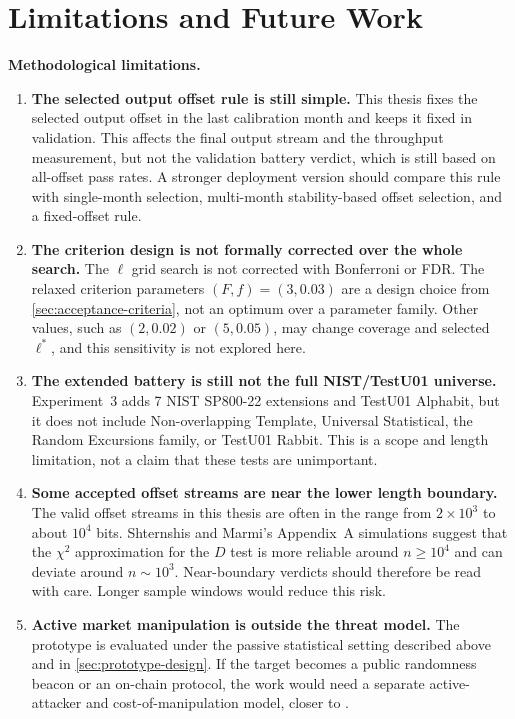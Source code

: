 \documentclass[11pt,titlepage,openany,oneside]{book}  %
\begin{document}
\section{Limitations and Future Work}
\label{sec:limitations-future-work}

\textbf{Methodological limitations.}

\begin{enumerate}
\item \textbf{The selected output offset rule is still simple.} This thesis fixes the selected output offset in the last calibration month and keeps it fixed in validation. This affects the final output stream and the throughput measurement, but not the validation battery verdict, which is still based on all-offset pass rates. A stronger deployment version should compare this rule with single-month selection, multi-month stability-based offset selection, and a fixed-offset rule.

\item \textbf{The criterion design is not formally corrected over the whole search.} The $\ell$ grid search is not corrected with Bonferroni or FDR. The relaxed criterion parameters $(F,f)=(3,0.03)$ are a design choice from \cref{sec:acceptance-criteria}, not an optimum over a parameter family. Other values, such as $(2,0.02)$ or $(5,0.05)$, may change coverage and selected $\ell^*$, and this sensitivity is not explored here.

\item \textbf{The extended battery is still not the full NIST/TestU01 universe.} Experiment~3 adds 7 NIST SP800-22 extensions and TestU01 Alphabit, but it does not include Non-overlapping Template, Universal Statistical, the Random Excursions family, or TestU01 Rabbit. This is a scope and length limitation, not a claim that these tests are unimportant.

\item \textbf{Some accepted offset streams are near the lower length boundary.} The valid offset streams in this thesis are often in the range from $2\times 10^3$ to about $10^4$ bits. Shternshis and Marmi's Appendix~A simulations suggest that the $\chi^2$ approximation for the $D$ test is more reliable around $n \geq 10^4$ and can deviate around $n \sim 10^3$. Near-boundary verdicts should therefore be read with care. Longer sample windows would reduce this risk.

\item \textbf{Active market manipulation is outside the threat model.} The prototype is evaluated under the passive statistical setting described above and in \cref{sec:prototype-design}. If the target becomes a public randomness beacon or an on-chain protocol, the work would need a separate active-attacker and cost-of-manipulation model, closer to \citet{landis2025beacon}.
\end{enumerate}
\end{document}

